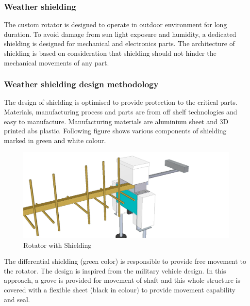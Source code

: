 \subsubsection{Weather shielding}
The custom rotator is designed to operate in outdoor environment for long duration. To avoid damage from sun light exposure and humidity, a dedicated shielding is designed for mechanical and electronics parts. The architecture of shielding is based on consideration that shielding should not hinder the mechanical movements of any part. 
\subsubsection*{Weather shielding design methodology}
The design of shielding is optimised to provide protection to the critical parts. Materials, manufacturing process and parts are from off shelf technologies and easy to manufacture. Manufacturing materials are aluminium sheet and 3D printed abs plastic. Following figure shows various components of shielding marked in green and white colour.     
\begin{figure}[H]
	\centering
	\includegraphics[width=\linewidth]{../art/overing.jpg}
	\caption{Rotator with Shielding}
\end{figure}

The differential shielding (green color) is responsible to provide free movement to the rotator. The design is inspired from the military vehicle design. In this approach, a grove is provided for movement of shaft and this whole structure is covered with a flexible sheet (black in colour) to provide movement capability and seal. 

